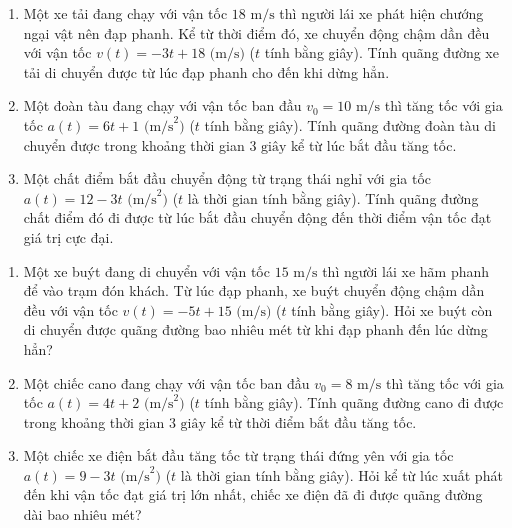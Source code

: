 \documentclass[12pt]{article}
\begin{document}
	\begin{btvang}
		\begin{enumerate}[label=\textbf{Bài \arabic*.}]
			\item Một xe tải đang chạy với vận tốc $18\text{ m/s}$ thì người lái xe phát hiện chướng ngại vật nên đạp phanh. Kể từ thời điểm đó, xe chuyển động chậm dần đều với vận tốc $v(t) = -3t + 18\text{ (m/s)}$ ($t$ tính bằng giây). Tính quãng đường xe tải di chuyển được từ lúc đạp phanh cho đến khi dừng hẳn.
			\item Một đoàn tàu đang chạy với vận tốc ban đầu $v_0 = 10\text{ m/s}$ thì tăng tốc với gia tốc $a(t) = 6t + 1\text{ (m/s}^2\text{)}$ ($t$ tính bằng giây). Tính quãng đường đoàn tàu di chuyển được trong khoảng thời gian $3\text{ giây}$ kể từ lúc bắt đầu tăng tốc.
			\item Một chất điểm bắt đầu chuyển động từ trạng thái nghỉ với gia tốc $a(t) = 12 - 3t\text{ (m/s}^2\text{)}$ ($t$ là thời gian tính bằng giây). Tính quãng đường chất điểm đó đi được từ lúc bắt đầu chuyển động đến thời điểm vận tốc đạt giá trị cực đại.
		\end{enumerate}
	\end{btvang}
	
	\begin{btdo}
		\begin{enumerate}[label=\textbf{Bài \arabic*.}]
			\item Một xe buýt đang di chuyển với vận tốc $15\text{ m/s}$ thì người lái xe hãm phanh để vào trạm đón khách. Từ lúc đạp phanh, xe buýt chuyển động chậm dần đều với vận tốc $v(t) = -5t + 15\text{ (m/s)}$ ($t$ tính bằng giây). Hỏi xe buýt còn di chuyển được quãng đường bao nhiêu mét từ khi đạp phanh đến lúc dừng hẳn?
			\item Một chiếc cano đang chạy với vận tốc ban đầu $v_0 = 8\text{ m/s}$ thì tăng tốc với gia tốc $a(t) = 4t + 2\text{ (m/s}^2\text{)}$ ($t$ tính bằng giây). Tính quãng đường cano đi được trong khoảng thời gian $3\text{ giây}$ kể từ thời điểm bắt đầu tăng tốc.
			\item Một chiếc xe điện bắt đầu tăng tốc từ trạng thái đứng yên với gia tốc $a(t) = 9 - 3t\text{ (m/s}^2\text{)}$ ($t$ là thời gian tính bằng giây). Hỏi kể từ lúc xuất phát đến khi vận tốc đạt giá trị lớn nhất, chiếc xe điện đã đi được quãng đường dài bao nhiêu mét?
		\end{enumerate}
	\end{btdo}
	
\end{document}
